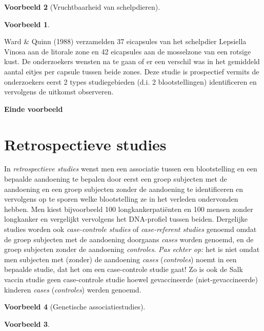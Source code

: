 \documentclass[
  12pt,dutch,coursenotes]{book}
\theoremstyle{definition}
\theoremstyle{definition}
\newtheorem{example}{Voorbeeld}[chapter]
\theoremstyle{definition}
\theoremstyle{remark}
\begin{document}
\begin{example}[Vruchtbaarheid van schelpdieren]
\begin{example}

\protect\hypertarget{exm:unnamed-chunk-85}{}{\label{exm:unnamed-chunk-85} \iffalse (Vruchtbaarheid van schelpdieren) \fi{} }

\end{example}
\end{example}

Ward \& Quinn (1988) verzamelden 37 eicapsules van het schelpdier Lepsiella Vinosa aan de litorale zone en 42 eicapsules aan de mosselzone van een rotsige kust. De onderzoekers wensten na te gaan of er een verschil was in het gemiddeld aantal eitjes per capsule tussen beide zones. Deze studie is prospectief vermits de onderzoekers eerst 2 types studiegebieden (d.i. 2 blootstellingen) identificeren en vervolgens de uitkomst observeren.

\textbf{Einde voorbeeld}

\hypertarget{subsec:design:retro}{%
\section{Retrospectieve studies}\label{subsec:design:retro}}

In \emph{retrospectieve studies} wenst men een associatie tussen een
blootstelling en een bepaalde aandoening te bepalen door eerst een groep
subjecten met de aandoening en een groep subjecten zonder de aandoening te
identificeren en vervolgens op te sporen welke blootstelling ze in het
verleden ondervonden hebben. Men kiest bijvoorbeeld 100
longkankerpatiënten en 100 mensen zonder longkanker en vergelijkt vervolgens het DNA-profiel tussen beiden. Dergelijke studies worden
ook \emph{case-controle studies} of \emph{case-referent studies} genoemd
omdat de groep subjecten met de aandoening doorgaans \emph{cases} worden genoemd,
en de groep subjecten zonder de aandoening \emph{controles}. \emph{Pas echter op:} het is niet omdat men subjecten met (zonder) de aandoening \emph{cases}
(\emph{controles}) noemt in een bepaalde studie, dat het om een case-controle
studie gaat! Zo is ook de Salk vaccin studie geen case-controle studie
hoewel gevaccineerde (niet-gevaccineerde) kinderen \emph{cases} (\emph{controles})
werden genoemd.

\begin{example}[Genetische associatiestudies]
\begin{example}

\protect\hypertarget{exm:brcaLeu}{}{\label{exm:brcaLeu} \iffalse (Genetische associatiestudies) \fi{} }

\end{example}
\end{example}
\end{document}
